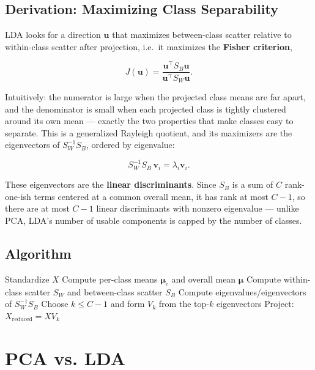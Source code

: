 \documentclass[11pt]{article}
\begin{document}
\subsection{Derivation: Maximizing Class Separability}

LDA looks for a direction $\mathbf{u}$ that maximizes between-class
scatter relative to within-class scatter after projection, i.e.\ it
maximizes the \textbf{Fisher criterion},

\[
  J(\mathbf{u}) = \frac{\mathbf{u}^\top S_B \mathbf{u}}{\mathbf{u}^\top S_W \mathbf{u}}.
\]

Intuitively: the numerator is large when the projected class means are far
apart, and the denominator is small when each projected class is tightly
clustered around its own mean --- exactly the two properties that make
classes easy to separate. This is a generalized Rayleigh quotient, and its
maximizers are the eigenvectors of $S_W^{-1} S_B$, ordered by eigenvalue:

\[
  S_W^{-1} S_B \, \mathbf{v}_i = \lambda_i \mathbf{v}_i.
\]

These eigenvectors are the \textbf{linear discriminants}. Since $S_B$ is a
sum of $C$ rank-one-ish terms centered at a common overall mean, it has
rank at most $C - 1$, so there are at most $C - 1$ linear discriminants
with nonzero eigenvalue --- unlike PCA, LDA's number of usable components
is capped by the number of classes.

\subsection{Algorithm}

\begin{algorithm}[h]
\caption{LDA}
\begin{algorithmic}[1]
\State Standardize $X$
\State Compute per-class means $\boldsymbol{\mu}_c$ and overall mean $\boldsymbol{\mu}$
\State Compute within-class scatter $S_W$ and between-class scatter $S_B$
\State Compute eigenvalues/eigenvectors of $S_W^{-1} S_B$
\State Choose $k \le C - 1$ and form $V_k$ from the top-$k$ eigenvectors
\State Project: $X_{\text{reduced}} = X V_k$
\end{algorithmic}
\end{algorithm}

\section{PCA vs. LDA}
\end{document}
